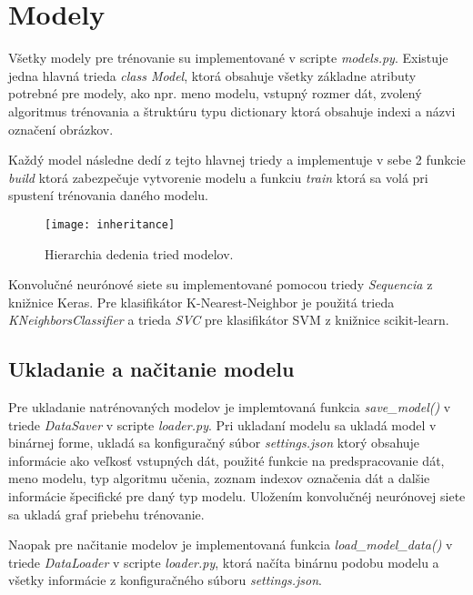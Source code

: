 
\section{Modely}
\label{sec:modely}
Všetky modely pre trénovanie su implementované v scripte \textit{models.py}.
Existuje jedna hlavná trieda \textit{class Model}, ktorá obsahuje všetky základne atributy potrebné pre modely, ako npr.
    meno modelu, vstupný rozmer dát, zvolený algoritmus trénovania a štruktúru typu dictionary ktorá obsahuje indexi a názvi označení obrázkov.

Každý model následne dedí z tejto hlavnej triedy a implementuje v sebe 2 funkcie \textit{build} ktorá zabezpečuje vytvorenie modelu a
    funkciu \textit{train} ktorá sa volá pri spustení trénovania daného modelu.

\begin{figure}[H]
    \centering
    \texttt{[image: inheritance]}
    \caption{Hierarchia dedenia tried modelov.}
    \label{pic:inheritance}
\end{figure}

Konvolučné neurónové siete su implementované pomocou triedy \textit{Sequencia} z knižnice Keras.
Pre klasifikátor K-Nearest-Neighbor je použitá trieda \textit{KNeighborsClassifier} a trieda \textit{SVC} pre klasifikátor SVM z knižnice scikit-learn.

\subsection{Ukladanie a načitanie modelu}
\label{subsec:ukladaniemodelu}
Pre ukladanie natrénovaných modelov je implemtovaná funkcia \textit{save\_model()} v triede \textit{DataSaver} v scripte \textit{loader.py}.
Pri ukladaní modelu sa ukladá model v binárnej forme, ukladá sa konfiguračný súbor \textit{settings.json} ktorý obsahuje informácie ako veľkosť
    vstupných dát, použité funkcie na predspracovanie dát, meno modelu, typ algoritmu učenia, zoznam indexov označenia dát a dalšie informácie
    špecifické pre daný typ modelu.
Uložením konvolučnéj neurónovej siete sa ukladá graf priebehu trénovanie.

Naopak pre načitanie modelov je implementovaná funkcia \textit{load\_model\_data()} v triede \textit{DataLoader} v scripte \textit{loader.py},
    ktorá načíta binárnu podobu modelu a všetky informácie z konfiguračného súboru \textit{settings.json}.
